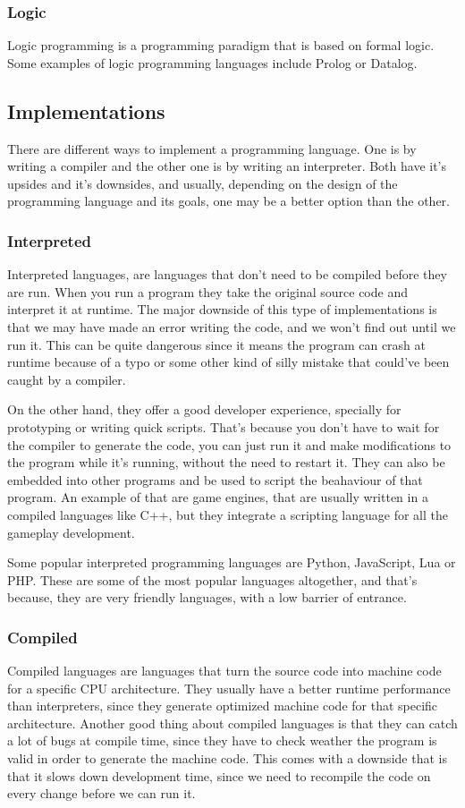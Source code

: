 ﻿\documentclass[10pt,a4paper,twocolumn,twoside]{article}
\begin{document}
\subsubsection{Logic}
Logic programming is a programming paradigm that is based on formal logic. 
Some examples of logic programming languages include Prolog or Datalog.

\subsection{Implementations}
There are different ways to implement a programming language. One is by writing
a compiler and the other one is by writing an interpreter. Both have it's
upsides and it's downsides, and usually, depending on the design of the
programming language and its goals, one may be a better option than the other.

\subsubsection{Interpreted}
Interpreted languages, are languages that don't need to be compiled before they
are run. When you run a program they take the original source code and interpret
it at runtime. The major downside of this type of implementations is that we may
have made an error writing the code, and we won't find out until we run it. This
can be quite dangerous since it means the program can crash at runtime because
of a typo or some other kind of silly mistake that could've been caught by a
compiler.

On the other hand, they offer a good developer experience, specially for
prototyping or writing quick scripts. That's because you don't have to wait for
the compiler to generate the code, you can just run it and make modifications to
the program while it's running, without the need to restart it. They can also be
embedded into other programs and be used to script the beahaviour of that
program. An example of that are game engines, that are usually written in a
compiled languages like C++, but they integrate a scripting language for all the
gameplay development.

Some popular interpreted programming languages are Python, JavaScript, Lua or
PHP. These are some of the most popular languages altogether, and that's
because, they are very friendly languages, with a low barrier of entrance.

\subsubsection{Compiled}
Compiled languages are languages that turn the source code into machine code for
a specific CPU architecture. They usually have a better runtime performance than
interpreters, since they generate optimized machine code for that specific
architecture. Another good thing about compiled languages is that they can catch
a lot of bugs at compile time, since they have to check weather the program is
valid in order to generate the machine code. This comes with a downside that is
that it slows down development time, since we need to recompile the code on
every change before we can run it.
\end{document}
